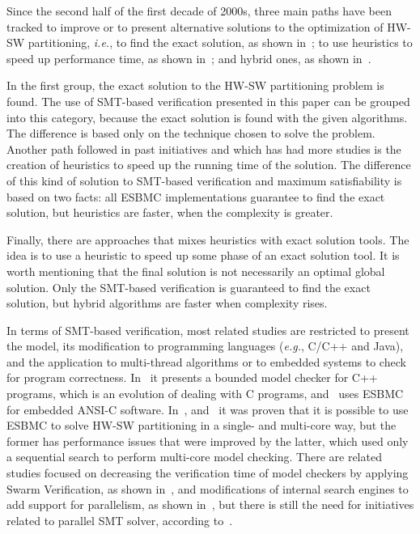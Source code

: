 \documentclass{doublecol-new}
\theoremstyle{TH}{
\newtheorem{lemma}{Lemma}
\newtheorem{theorem}[lemma]{Theorem}
\newtheorem{corrolary}[lemma]{Corrolary}
\newtheorem{conjecture}[lemma]{Conjecture}
\newtheorem{proposition}[lemma]{Proposition}
\newtheorem{claim}[lemma]{Claim}
\newtheorem{stheorem}[lemma]{Wrong Theorem}
\newtheorem{algorithm}{Algorithm}
}
\theoremstyle{THrm}{
\newtheorem{definition}{Definition}[section]
\newtheorem{question}{Question}[section]
\newtheorem{remark}{Remark}
\newtheorem{scheme}{Scheme}
}
\theoremstyle{THhit}{
\newtheorem{case}{Case}[section]
}
\begin{document}
Since the second half of the first decade of 2000s, three main paths have been tracked to improve or to present alternative solutions to the optimization of HW-SW partitioning, {\it i.e.}, to find the exact solution, as shown in~\cite{Mann2007}; to use heuristics to speed up performance time, as shown in~\cite{Arato2003}; and hybrid ones, as shown in~\cite{Arato2005}.

In the first group, the exact solution to the HW-SW partitioning problem is found. The use of SMT-based verification presented in this paper can be grouped into this category, because the exact solution is found with the given algorithms. The difference is based only on the technique chosen to solve the problem.
Another path followed in past initiatives and which has had more studies is the creation of heuristics to speed up the running time of the solution. The difference of this kind of solution to SMT-based verification and maximum satisfiability is based on two facts: all ESBMC implementations guarantee to find the exact solution, but heuristics are faster, when the complexity is greater.

Finally, there are approaches that mixes heuristics with exact solution tools. The idea is to use a heuristic to speed up some phase of an exact solution tool. It is worth mentioning that the final solution is not necessarily an optimal global solution. Only the SMT-based verification is guaranteed to find the exact solution, but hybrid algorithms are faster when complexity rises.

In terms of SMT-based verification, most related studies are restricted to present the model, its modification to programming languages ({\it e.g.}, C/C++ and Java), and the application to multi-thread algorithms or to embedded systems to check for program correctness. In~\cite{Ramalho2013} it presents a bounded model checker for C++ programs, which is an evolution of dealing with C programs, and~\cite{Cordeiro2012} uses ESBMC for embedded ANSI-C software. In~\cite{Trindade2015}, and~\cite{Trindade2016} it was proven that it is possible to use ESBMC to solve HW-SW partitioning in a single- and multi-core way, but the former has performance issues that were improved by the latter, which used only a sequential search to perform multi-core model checking. There are related studies focused on decreasing the verification time of model checkers by applying Swarm Verification, as shown in~\cite{Holzmann2011}, and modifications of internal search engines to add support for parallelism, as shown in~\cite{Holzmann2012}, but there is still the need for initiatives related to parallel SMT solver, according to~\cite{Wintersteiger2009}. 
\end{document}
